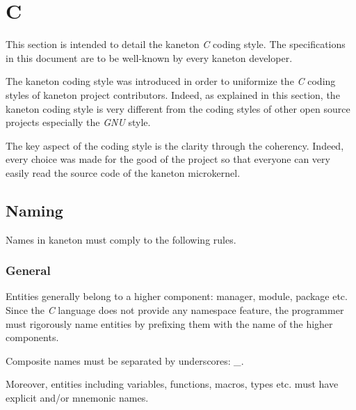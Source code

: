%
%
%
%
%
%

%
%

\section{C}
\label{section:c}

This section is intended to detail the kaneton \textit{C} coding style.
The specifications in this document are to be well-known by every kaneton
developer.

The kaneton coding style was introduced in order to uniformize the \textit{C}
coding styles of kaneton project contributors. Indeed, as explained in this
section, the kaneton coding style is very different from the coding styles
of other open source projects especially the \textit{GNU} style.

The key aspect of the coding style is the clarity through the coherency.
Indeed, every choice was made for the good of the project so that everyone
can very easily read the source code of the kaneton microkernel.

%
%

\subsection{Naming}

Names in kaneton must comply to the following rules.


\subsubsection{General}

Entities generally belong to a higher component: manager, module, package etc.
Since the \textit{C} language does not provide any namespace feature, the
programmer must rigorously name entities by prefixing them with the name
of the higher components.

Composite names must be separated by underscores: \textit{\_}.

Moreover, entities including variables, functions, macros, types etc. must
have explicit and/or mnemonic names.

